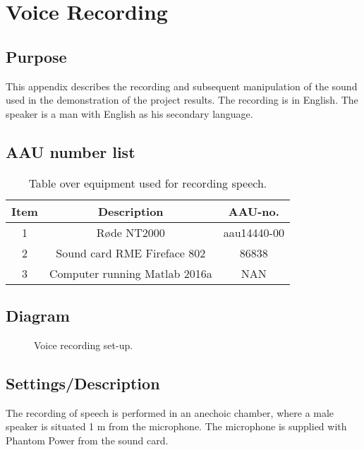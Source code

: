 \section{Voice Recording}
\subsection{Purpose}
This appendix describes the recording and subsequent manipulation of the sound used in the demonstration of the project results. The recording is in English. The speaker is a man with English as his secondary language. 

\subsection{AAU number list}
\begin{table}[H]
	\centering
	\begin{tabular}{ c c c } \toprule
		{Item}	& {Description} 						& {AAU-no}. \\ \bottomrule 
		1	& Røde NT2000 	& aau14440-00	\\
		2	& Sound card RME Fireface 802	& 86838 		\\
		3	& Computer running Matlab 2016a	 & 	NAN	\\
		\bottomrule
	\end{tabular}
	\caption{Table over equipment used for recording speech.}
	\label{tab:VoiceRec}
\end{table}

\subsection{Diagram}
\begin{figure}[H]
	\centering
	\caption{Voice recording set-up.}
	\label{fig:VoiceRecording}
\end{figure}

\subsection{Settings/Description}
The recording of speech is performed in an anechoic chamber, where a male speaker is situated 1 m from the microphone. The microphone is supplied with Phantom Power from the sound card. \\ 

